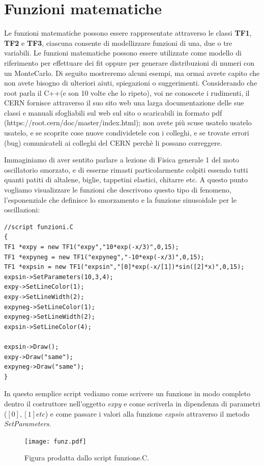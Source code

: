 \documentclass[11pt,fleqn]{book} %
\begin{document}
\section{Funzioni matematiche}

Le funzioni matematiche possono essere rappresentate attraverso le classi \textbf{TF1}, \textbf{TF2} e \textbf{TF3}, ciascuna consente di modellizzare 
funzioni di una, due o tre variabili.
Le funzioni matematiche possono essere utilizzate come modello di riferimento per effettuare dei fit oppure per generare distribuzioni di numeri con un MonteCarlo. Di seguito mostreremo alcuni esempi, ma ormai avrete capito che non avete bisogno di ulteriori aiuti, spiegazioni o suggerimenti. Considerando che root parla il C++(e son 10 volte che lo ripeto), voi ne conoscete i rudimenti, il CERN fornisce attraverso il suo sito web una larga documentazione delle sue classi e manuali sfogliabili sul web sul sito o scaricabili in formato pdf (https://root.cern/doc/master/index.html); non avete più scuse usatelo usatelo usatelo, e se scoprite cose nuove condividetele con i colleghi, e se trovate errori (bug) comunicateli ai colleghi del CERN perchè li possano correggere. 

Immaginiamo di aver sentito parlare a lezione di Fisica generale 1 del moto oscillatorio smorzato, e di esserne rimasti particolarmente colpiti essendo tutti quanti patiti di altalene, biglie, tappetini elastici, chitarre etc.
A questo punto vogliamo visualizzare le funzioni che descrivono questo tipo di fenomeno, l'esponenziale che definisce lo smorzamento e la funzione sinusoidale per le oscillazioni:
\begin{verbatim}
//script funzioni.C
{
TF1 *expy = new TF1("expy","10*exp(-x/3)",0,15);
TF1 *expyneg = new TF1("expyneg","-10*exp(-x/3)",0,15);
TF1 *expsin = new TF1("expsin","[0]*exp(-x/[1])*sin([2]*x)",0,15);
expsin->SetParameters(10,3,4);
expy->SetLineColor(1);
expy->SetLineWidth(2);
expyneg->SetLineColor(1);
expyneg->SetLineWidth(2);
expsin->SetLineColor(4);

expsin->Draw();
expy->Draw("same");
expyneg->Draw("same");
}
\end{verbatim}
In questo semplice script vediamo come scrivere un funzione in modo completo dentro il costruttore nell'oggetto \textit{expy} e come scriverla in dipendenza di parametri ($[0],[1] etc$) e come passare i valori alla funzione \textit{expsin} attraverso il metodo \textit{SetParameters}.


\begin{figure}
\centering
\texttt{[image: funz.pdf]}
\caption{Figura prodatta dallo script funzione.C.\label{funzi}}
\end{figure}
\end{document}
